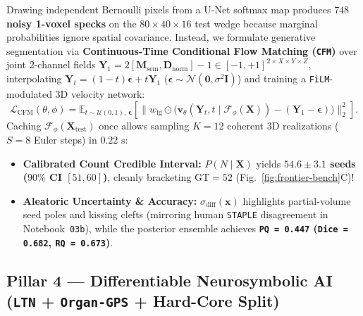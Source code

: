 \documentclass[10.5pt,a4paper]{article}
\begin{document}
Drawing independent Bernoulli pixels from a U-Net softmax map produces \textbf{$748$ noisy 1-voxel specks} on the $80\times 40\times 16$ test wedge because marginal probabilities ignore spatial covariance. Instead, we formulate generative segmentation via \textbf{Continuous-Time Conditional Flow Matching (\texttt{CFM})} \cite{wu2024medsegdiff,rahman2023cimd,liu2023flow} over joint 2-channel fields $\mathbf{Y}_1 = 2[\mathbf{M}_{\text{sem}}, \mathbf{D}_{\text{norm}}] - 1 \in [-1, +1]^{2\times X\times Y\times Z}$, interpolating $\mathbf{Y}_t = (1-t)\boldsymbol{\epsilon} + t\mathbf{Y}_1$ ($\boldsymbol{\epsilon}\sim\mathcal{N}(\mathbf{0}, \sigma^2\mathbf{I})$) and training a \texttt{FiLM}-modulated 3D velocity network:
\begin{equation}
    \mathcal{L}_{\text{CFM}}(\theta, \phi) = \mathbb{E}_{t\sim\mathcal{U}(0,1),\,\boldsymbol{\epsilon}}\!\left[\big\lVert w_{\text{fg}} \odot \big(\mathbf{v}_\theta(\mathbf{Y}_t, t \mid \mathcal{F}_\phi(\mathbf{X})) - (\mathbf{Y}_1 - \boldsymbol{\epsilon})\big) \big\rVert_2^2\right].
\end{equation}
Caching $\mathcal{F}_\phi(\mathbf{X}_{\text{test}})$ once allows sampling $K=12$ coherent 3D realizations ($S=8$ Euler steps) in \textbf{$0.22\text{ s}$}:
\begin{itemize}
    \item \textbf{Calibrated Count Credible Interval:} $P(N\mid\mathbf{X})$ yields \textbf{$54.6 \pm 3.1$ seeds ($90\%$ CI $[51, 60]$)}, cleanly bracketing \textbf{$\text{GT} = 52$} (Fig.~\ref{fig:frontier-bench}C)!
    \item \textbf{Aleatoric Uncertainty \& Accuracy:} $\sigma_{\text{diff}}(\mathbf{x})$ highlights partial-volume seed poles and kissing clefts (mirroring human \texttt{STAPLE} disagreement in Notebook~\texttt{03b}), while the posterior ensemble achieves \textbf{\texttt{PQ = 0.447} (\texttt{Dice = 0.682}, \texttt{RQ = 0.673})}.
\end{itemize}

\subsection{Pillar 4 --- Differentiable Neurosymbolic AI (\texttt{LTN} + \texttt{Organ-GPS} + Hard-Core Split)}
\end{document}
